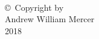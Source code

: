 
\thispagestyle{empty}
\hbox{\ }

\vfill
\renewcommand{\baselinestretch}{1}
\small\normalsize

\vspace{-.65in}

\begin{center}
\large{\copyright \hbox{ }Copyright by\\
Andrew William Mercer  %
\\
2018}
\end{center}

\vfill

\newpage

\hbox{\ }
\newpage
